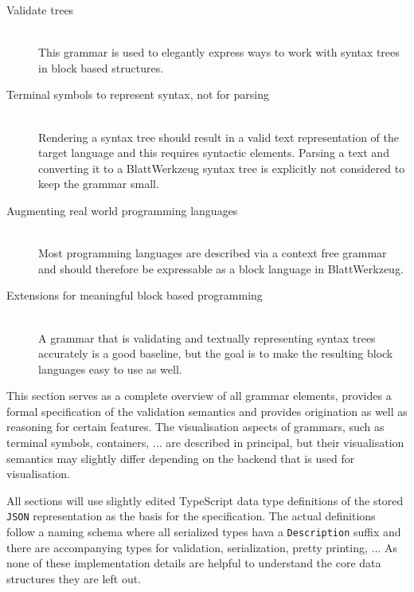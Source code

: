 \documentclass[]{report}
\begin{document}
\begin{description}
\item[Validate trees] \hfill\\
  This grammar is used to elegantly express ways to work with syntax trees in block based structures.
\item[Terminal symbols to represent syntax, not for parsing] \hfill\\
  Rendering a syntax tree should result in a valid text representation of the target language and this requires syntactic elements. Parsing a text and converting it to a Blatt\-Werkzeug syntax tree is explicitly not considered to keep the grammar small.
\item[Augmenting real world programming languages] \hfill\\
  Most programming languages are described via a context free grammar and should therefore be expressable as a block language in Blatt\-Werkzeug.
\item[Extensions for meaningful block based programming] \hfill\\
  A grammar that is validating and textually representing syntax trees accurately is a good baseline, but the goal is to make the resulting block languages easy to use as well.
\end{description}

This section serves as a complete overview of all grammar elements, provides a formal specification of the validation semantics and provides origination as well as reasoning for certain features. The visualisation aspects of grammars, such as terminal symbols, containers, ... are described in principal, but their visualisation semantics may slightly differ depending on the backend that is used for visualisation.

All sections will use slightly edited TypeScript data type definitions of the stored \texttt{JSON} representation as the basis for the specification. The actual definitions follow a naming schema where all serialized types hava a \texttt{Description} suffix and there are accompanying types for validation, serialization, pretty printing, ... As none of these implementation details are helpful to understand the core data structures they are left out.
\end{document}
